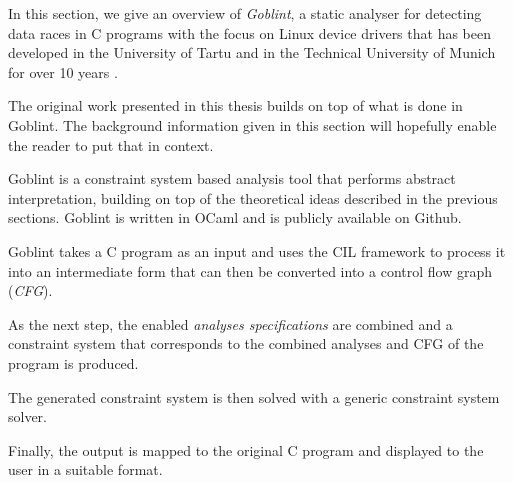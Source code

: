 \documentclass[..thesis.tex]{subfiles}
\begin{document}

In this section, we give an overview  of \textit{Goblint}, a static analyser for detecting data races in C programs with the focus on Linux device drivers that has been developed in the University of Tartu and in the Technical University of Munich for over 10 years \cite{vojdani_static_2016,_goblint_????,apinis_frameworks_2014,vojdanivesal_static_2010}.



The original work presented in this thesis builds on top of what is done in Goblint. The background information given in this section will hopefully enable the reader to put that in context.



Goblint is a constraint system based analysis tool that performs abstract interpretation, building on top of the theoretical ideas described in the previous sections. Goblint is written in OCaml and is publicly available on Github.

Goblint takes a C program as an input and uses the CIL framework to process it into an intermediate form that can then be converted into a control flow graph (\textit{CFG}). 


As the next step, the enabled \textit{analyses specifications} are combined and a constraint system that corresponds to the combined analyses and CFG of the program is produced.

The generated constraint system is then solved with a generic constraint system solver. 

Finally, the output is mapped to the original C program and displayed to the user in a suitable format.
\end{document}
